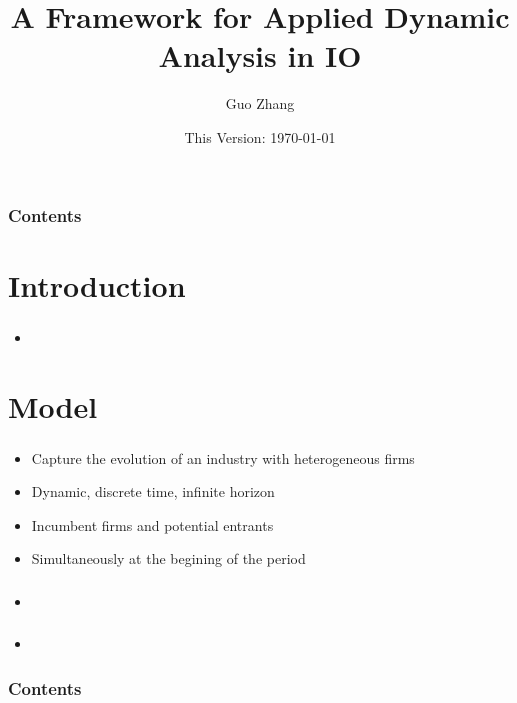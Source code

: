 \documentclass{beamer}
\title{A Framework for Applied Dynamic Analysis in IO}
\subtitle{}
\author{Guo Zhang}
\institute{WISE, Xiamen University}
\date{This Version: \today}
\begin{document}
\begin{frame}
\maketitle
\end{frame}

\begin{frame}[plain]
\frametitle{Contents}
\tableofcontents[hideallsubsections]
\end{frame}

\section{Introduction}
\begin{frame}
\frametitle{}
\begin{itemize}
\item 
\end{itemize}
\end{frame}

\section{Model}
\begin{frame}
\frametitle{}
\begin{itemize}
\item Capture the evolution of an industry with heterogeneous firms
\item Dynamic, discrete time, infinite horizon
\item Incumbent firms and potential entrants
\item Simultaneously at the begining of the period
\end{itemize}
\end{frame}

\begin{frame}
\frametitle{}
\begin{itemize}
\item 
\end{itemize}
\end{frame}

\begin{frame}
\frametitle{}
\begin{itemize}
\item 
\end{itemize}
\end{frame}

\begin{frame}[plain]
\frametitle{Contents}
\tableofcontents[hideallsubsections]
\end{frame}
\end{document}
